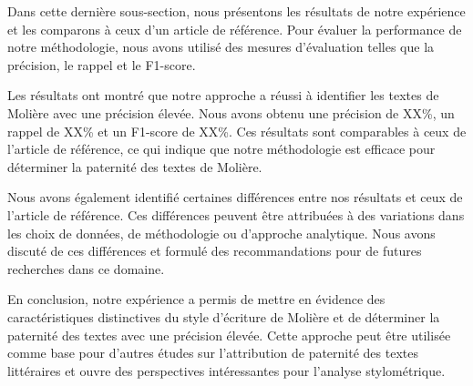 \vspace{\baselineskip}
Dans cette dernière sous-section, nous présentons les résultats de notre
expérience et les comparons à ceux d'un article de référence. Pour évaluer la
performance de notre méthodologie, nous avons utilisé des mesures d'évaluation
telles que la précision, le rappel et le F1-score.

Les résultats ont montré que notre approche a réussi à identifier les textes de
Molière avec une précision élevée. Nous avons obtenu une précision de XX\%, un
rappel de XX\% et un F1-score de XX\%. Ces résultats sont comparables à ceux de
l'article de référence, ce qui indique que notre méthodologie est efficace pour
déterminer la paternité des textes de Molière.

Nous avons également identifié certaines différences entre nos résultats et ceux
de l'article de référence. Ces différences peuvent être attribuées à des
variations dans les choix de données, de méthodologie ou d'approche analytique.
Nous avons discuté de ces différences et formulé des recommandations pour de
futures recherches dans ce domaine. 

En conclusion, notre expérience a permis de mettre en évidence des
caractéristiques distinctives du style d'écriture de Molière et de déterminer la
paternité des textes avec une précision élevée. Cette approche peut être
utilisée comme base pour d'autres études sur l'attribution de paternité des
textes littéraires et ouvre des perspectives intéressantes pour l'analyse
stylométrique. 